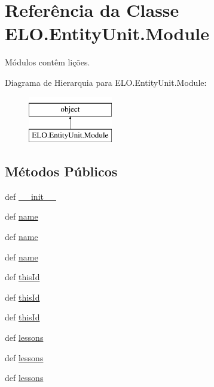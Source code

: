 \hypertarget{classELO_1_1EntityUnit_1_1Module}{\section{Referência da Classe E\-L\-O.\-Entity\-Unit.\-Module}
\label{classELO_1_1EntityUnit_1_1Module}
}


Módulos contêm lições.  


Diagrama de Hierarquia para E\-L\-O.\-Entity\-Unit.\-Module\-:\begin{figure}[H]
\begin{center}
\leavevmode
\includegraphics[height=2.000000cm]{db/de8/classELO_1_1EntityUnit_1_1Module}
\end{center}
\end{figure}
\subsection*{Métodos Públicos}
\begin{DoxyCompactItemize}
\item 
def \hyperlink{classELO_1_1EntityUnit_1_1Module_ae99b8d113f1b21fcac85063ba5599e35}{\-\_\-\-\_\-init\-\_\-\-\_\-}
\item 
def \hyperlink{classELO_1_1EntityUnit_1_1Module_aacb77acc28005833928a7c6f971f44b5}{name}
\item 
def \hyperlink{classELO_1_1EntityUnit_1_1Module_aacb77acc28005833928a7c6f971f44b5}{name}
\item 
def \hyperlink{classELO_1_1EntityUnit_1_1Module_aacb77acc28005833928a7c6f971f44b5}{name}
\item 
def \hyperlink{classELO_1_1EntityUnit_1_1Module_a7833604c3c13e2fdc5f4bce8712c2118}{this\-Id}
\item 
def \hyperlink{classELO_1_1EntityUnit_1_1Module_a7833604c3c13e2fdc5f4bce8712c2118}{this\-Id}
\item 
def \hyperlink{classELO_1_1EntityUnit_1_1Module_a7833604c3c13e2fdc5f4bce8712c2118}{this\-Id}
\item 
def \hyperlink{classELO_1_1EntityUnit_1_1Module_a4b12f83ecbf3722070716c9ca5adb80a}{lessons}
\item 
def \hyperlink{classELO_1_1EntityUnit_1_1Module_a4b12f83ecbf3722070716c9ca5adb80a}{lessons}
\item 
def \hyperlink{classELO_1_1EntityUnit_1_1Module_a4b12f83ecbf3722070716c9ca5adb80a}{lessons}
\end{DoxyCompactItemize}
